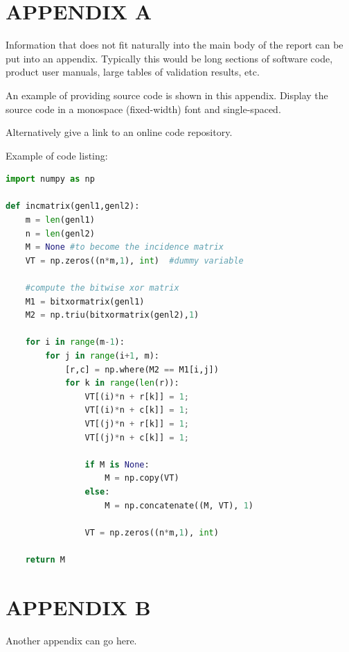 \documentclass{article}
\begin{document}
\newpage



\newpage
\section*{APPENDIX A}
Information that does not fit naturally into the main body of the report can be put into an appendix. Typically this would be long sections of software code, product user manuals, large tables of validation results, etc.
\par
An example of providing source code is shown in this appendix. Display the source code in a monospace (fixed-width) font and single-spaced. 
\par
Alternatively give a link to an online code repository.
\par
Example of code listing:
\begin{lstlisting}[language=Python]
import numpy as np
    
def incmatrix(genl1,genl2):
    m = len(genl1)
    n = len(genl2)
    M = None #to become the incidence matrix
    VT = np.zeros((n*m,1), int)  #dummy variable
    
    #compute the bitwise xor matrix
    M1 = bitxormatrix(genl1)
    M2 = np.triu(bitxormatrix(genl2),1) 

    for i in range(m-1):
        for j in range(i+1, m):
            [r,c] = np.where(M2 == M1[i,j])
            for k in range(len(r)):
                VT[(i)*n + r[k]] = 1;
                VT[(i)*n + c[k]] = 1;
                VT[(j)*n + r[k]] = 1;
                VT[(j)*n + c[k]] = 1;
                
                if M is None:
                    M = np.copy(VT)
                else:
                    M = np.concatenate((M, VT), 1)
                
                VT = np.zeros((n*m,1), int)
    
    return M
\end{lstlisting}


\newpage
\section*{APPENDIX B}
Another appendix can go here.
\end{document}
